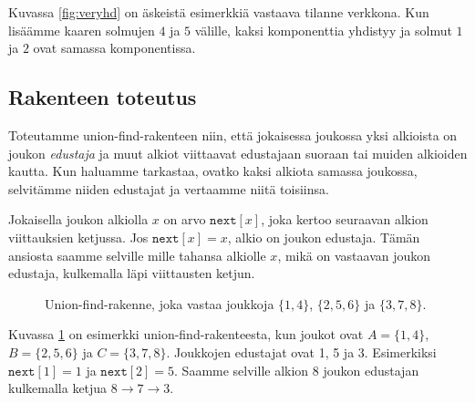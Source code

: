 Kuvassa \ref{fig:veryhd} on äskeistä esimerkkiä vastaava tilanne verkkona.
Kun li\-säämme kaaren solmujen $4$ ja $5$ välille,
kaksi komponenttia yhdistyy ja solmut $1$ ja $2$
ovat samassa komponentissa.

\subsection{Rakenteen toteutus}

Toteutamme union-find-rakenteen niin, että jokaisessa joukossa
yksi alkioista on joukon \emph{edustaja} ja muut alkiot viittaavat
edustajaan suoraan tai muiden alkioiden kautta.
Kun haluamme tarkastaa, ovatko kaksi alkiota samassa joukossa,
selvitämme niiden edustajat ja vertaamme niitä toisiinsa.

Jokaisella joukon alkiolla $x$ on arvo $\texttt{next}[x]$,
joka kertoo seuraavan alkion viittauksien ketjussa.
Jos $\texttt{next}[x]=x$, alkio on joukon edustaja.
Tämän ansiosta saamme selville mille tahansa alkiolle $x$,
mikä on vastaavan joukon edustaja, kulkemalla läpi viittausten ketjun.

\begin{figure}
\center
\begin{center}
\end{center}
\caption{Union-find-rakenne, joka vastaa joukkoja $\{1,4\}$, $\{2,5,6\}$ ja $\{3,7,8\}$.}
\label{fig:unifin}
\end{figure}

Kuvassa \ref{fig:unifin} on esimerkki union-find-rakenteesta, kun joukot ovat
$A=\{1,4\}$, $B=\{2,5,6\}$ ja $C=\{3,7,8\}$.
Joukkojen edustajat ovat 1, 5 ja 3.
Esimerkiksi $\texttt{next}[1]=1$ ja $\texttt{next}[2]=5$.
Saamme selville alkion 8 joukon edustajan kulkemalla ketjua
$8 \rightarrow 7 \rightarrow 3$.

